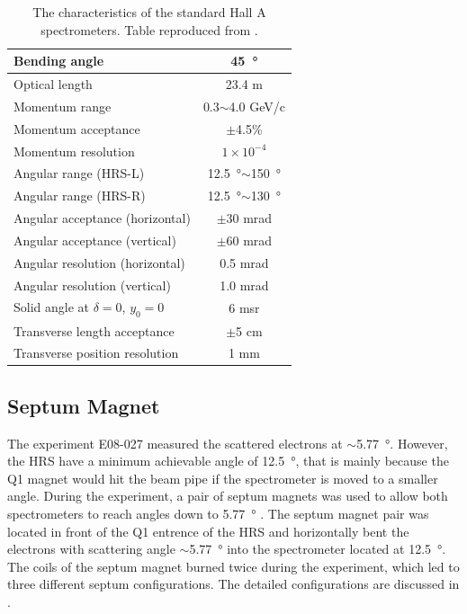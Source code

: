 \begin{table}[p!]
  \centering
  \begin{tabular}{|l|c|}
    \hline\hline
    Bending angle & \SI{45}{\degree} \\ \hline
    Optical length & 23.4 m \\ \hline
    Momentum range & 0.3$\sim$4.0 GeV/c \\ \hline
    Momentum acceptance & $\pm$4.5\% \\ \hline
    Momentum resolution & $1\times10^{-4}$ \\ \hline
    Angular range (HRS-L) & \SI{12.5}{\degree}$\sim$\SI{150}{\degree} \\ \hline
    Angular range (HRS-R) & \SI{12.5}{\degree}$\sim$\SI{130}{\degree} \\ \hline
    Angular acceptance (horizontal) & $\pm$30 mrad \\ \hline
    Angular acceptance (vertical) & $\pm$60 mrad \\ \hline
    Angular resolution (horizontal) & 0.5 mrad \\ \hline
    Angular resolution (vertical) & 1.0 mrad \\ \hline
    Solid angle at $\delta=0$, $y_0=0$ & 6 msr \\ \hline
    Transverse length acceptance & $\pm$5 cm \\ \hline
    Transverse position resolution & 1 mm \\ \hline
  \end{tabular}
  \caption[The characteristics of the HRS.]{The characteristics of the standard Hall A spectrometers. Table reproduced from \cite{Alcorn2004}. \label{C5S4T1}}
\end{table}

\subsection{Septum Magnet}
\label{C5S4SS1}

The experiment E08-027 measured the scattered electrons at $\sim$\SI{5.77}{\degree}. However, the HRS have a minimum achievable angle of \SI{12.5}{\degree}, that is mainly because the Q1 magnet would hit the beam pipe if the spectrometer is moved to a smaller angle. During the experiment, a pair of septum magnets was used to allow both spectrometers to reach angles down to \SI{5.77}{\degree} \cite{G2P}. The septum magnet pair was located in front of the Q1 entrence of the HRS and horizontally bent the electrons with scattering angle $\sim$\SI{5.77}{\degree} into the spectrometer located at \SI{12.5}{\degree}. The coils of the septum magnet burned twice during the experiment, which led to three different septum configurations. The detailed configurations are discussed in .

